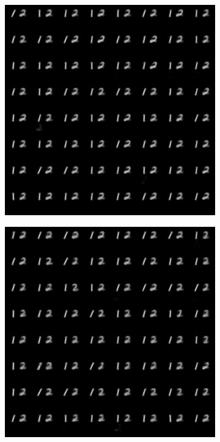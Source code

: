 \documentclass{article}
\begin{document}
\begin{figure}[!h]
    \begin{subfigure}[b]{.24\linewidth}
        \centering
        \includegraphics[width=\linewidth]{multimnist_mmvae_condition_on_image_12_image_sample.png}
        \caption{}
    \end{subfigure}
    \begin{subfigure}[b]{.24\linewidth}
        \centering
        \includegraphics[width=\linewidth]{multimnist_mmvae_condition_on_text_12_image_sample.png}

\end{subfigure}
\end{figure}
\end{document}
